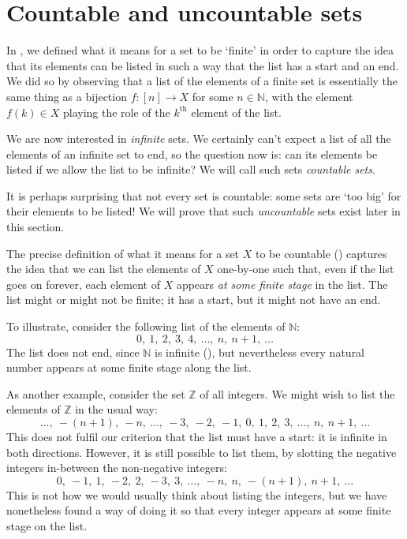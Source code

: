 \section{Countable and uncountable sets}

In , we defined what it means for a set to be `finite' in order to capture the idea that its elements can be listed in such a way that the list has a start and an end. We did so by observing that a list of the elements of a finite set is essentially the same thing as a bijection $f : [n] \to X$ for some $n \in \mathbb{N}$, with the element $f(k) \in X$ playing the role of the $k^{\text{th}}$ element of the list.

We are now interested in \textit{infinite} sets. We certainly can't expect a list of all the elements of an infinite set to end, so the question now is: can its elements be listed if we allow the list to be infinite? We will call such sets \textit{countable sets}.

It is perhaps surprising that not every set is countable: some sets are `too big' for their elements to be listed! We will prove that such \textit{uncountable} sets exist later in this section.

The precise definition of what it means for a set $X$ to be countable () captures the idea that we can list the elements of $X$ one-by-one such that, even if the list goes on forever, each element of $X$ appears \textit{at some finite stage} in the list. The list might or might not be finite; it has a start, but it might not have an end.

To illustrate, consider the following list of the elements of $\mathbb{N}$:
\[ 0,~ 1,~ 2,~ 3,~ 4,~ \dots,~ n,~ n+1,~ \dots \]
The list does not end, since $\mathbb{N}$ is infinite (), but nevertheless every natural number appears at some finite stage along the list.

As another example, consider the set $\mathbb{Z}$ of all integers. We might wish to list the elements of $\mathbb{Z}$ in the usual way:
\[ \dots,~ -(n+1),~ -n,~ \dots,~ -3,~ -2,~ -1,~ 0,~ 1,~ 2,~ 3,~ \dots,~ n,~ n+1,~ \dots \]
This does not fulfil our criterion that the list must have a start: it is infinite in both directions. However, it is still possible to list them, by slotting the negative integers in-between the non-negative integers:
\[ 0,~ -1,~ 1,~ -2,~ 2,~ -3,~ 3,~ \dots,~ -n,~ n,~ -(n+1),~ n+1,~ \dots\]
This is not how we would usually think about listing the integers, but we have nonetheless found a way of doing it so that every integer appears at some finite stage on the list.

